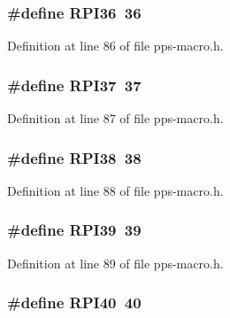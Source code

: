 \subsubsection[{R\+P\+I36}]{\setlength{\rightskip}{0pt plus 5cm}\#define R\+P\+I36~36}\label{pps-macro_8h_adcfb940538d64a022f788d6fa7b98b05}


Definition at line 86 of file pps-\/macro.\+h.

\hypertarget{pps-macro_8h_af998323f403afaa1f1ec2e0ca9353a31}{}
\subsubsection[{R\+P\+I37}]{\setlength{\rightskip}{0pt plus 5cm}\#define R\+P\+I37~37}\label{pps-macro_8h_af998323f403afaa1f1ec2e0ca9353a31}


Definition at line 87 of file pps-\/macro.\+h.

\hypertarget{pps-macro_8h_aafd64f5c6d9a5270a9e150da54aab911}{}
\subsubsection[{R\+P\+I38}]{\setlength{\rightskip}{0pt plus 5cm}\#define R\+P\+I38~38}\label{pps-macro_8h_aafd64f5c6d9a5270a9e150da54aab911}


Definition at line 88 of file pps-\/macro.\+h.

\hypertarget{pps-macro_8h_a0ca808dce8e0c6370593639993234a7c}{}
\subsubsection[{R\+P\+I39}]{\setlength{\rightskip}{0pt plus 5cm}\#define R\+P\+I39~39}\label{pps-macro_8h_a0ca808dce8e0c6370593639993234a7c}


Definition at line 89 of file pps-\/macro.\+h.

\hypertarget{pps-macro_8h_a4b32c589078f313c9763eadbd7cf5061}{}
\subsubsection[{R\+P\+I40}]{\setlength{\rightskip}{0pt plus 5cm}\#define R\+P\+I40~40}\label{pps-macro_8h_a4b32c589078f313c9763eadbd7cf5061}



